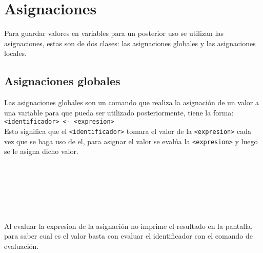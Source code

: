 
\titlespacing{\subsection}{0pt}{10pt}{0pt}

\chapter{Asignaciones}
   Para guardar valores en variables para un posterior uso se utilizan las asignaciones, estas son de dos clases: las asignaciones globales y las asignaciones locales.
   
   \section{Asignaciones globales}
      Las asignaciones globales son un comando que realiza la asignación de un valor a una variable para que pueda ser utilizado posteriormente, tiene la forma:
      \\
      
      \texttt{<identificador>~<-~<expresion>}
      \\
      
      Esto significa que el \texttt{<identificador>} tomara el valor de la \texttt{<expresion>} cada vez que se haga uso de el, para asignar el valor se evalúa la \texttt{<expresion>} y luego se le asigna dicho valor.
      
      \begin{fxcode}
         \\
         \\
         \\
         \\
         \\
      \end{fxcode}
      
      Al evaluar la expresion de la asignación no imprime el resultado en la pantalla, para saber cual es el valor basta con evaluar el identificador con el comando de evaluación.
      
      \begin{fxcode}
         \\
         \\
      \end{fxcode}
      
